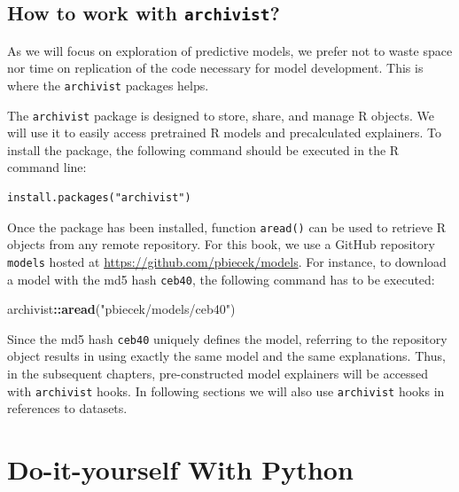 \documentclass[12pt,]{krantz}
\newenvironment{Shaded}{\begin{snugshade}}{\end{snugshade}}
\newcommand{\KeywordTok}[1]{\textcolor[rgb]{0.13,0.29,0.53}{\textbf{#1}}}
\newcommand{\NormalTok}[1]{#1}
\newcommand{\OperatorTok}[1]{\textcolor[rgb]{0.81,0.36,0.00}{\textbf{#1}}}
\newcommand{\StringTok}[1]{\textcolor[rgb]{0.31,0.60,0.02}{#1}}
\begin{document}
\hypertarget{how-to-work-with-archivist}{%
\subsection{\texorpdfstring{How to work with \texttt{archivist}?}{How to work with archivist?}}\label{how-to-work-with-archivist}}

As we will focus on exploration of predictive models, we prefer not to waste space nor time on replication of the code necessary for model development. This is where the \texttt{archivist} packages helps.

The \texttt{archivist} package \citep{archivist} is designed to store, share, and manage R objects. We will use it to easily access pretrained R models and precalculated explainers. To install the package, the following command should be executed in the R command line:

\begin{verbatim}
install.packages("archivist")
\end{verbatim}

Once the package has been installed, function \texttt{aread()} can be used to retrieve R objects from any remote repository. For this book, we use a GitHub repository \texttt{models} hosted at \url{https://github.com/pbiecek/models}. For instance, to download a model with the md5 hash \texttt{ceb40}, the following command has to be executed:

\begin{Shaded}
\begin{Highlighting}[]
\NormalTok{archivist}\OperatorTok{::}\KeywordTok{aread}\NormalTok{(}\StringTok{"pbiecek/models/ceb40"}\NormalTok{)}
\end{Highlighting}
\end{Shaded}

Since the md5 hash \texttt{ceb40} uniquely defines the model, referring to the repository object results in using exactly the same model and the same explanations. Thus, in the subsequent chapters, pre-constructed model explainers will be accessed with \texttt{archivist} hooks. In following sections we will also use \texttt{archivist} hooks in references to datasets.

\hypertarget{doItYourselfWithPython}{%
\section{Do-it-yourself With Python}\label{doItYourselfWithPython}}
\end{document}
